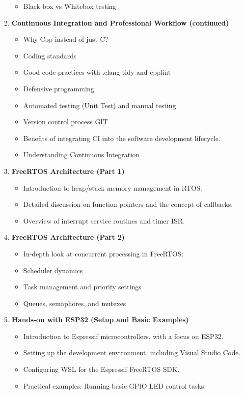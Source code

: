 \begin{enumerate}[label=\textbf{Week \arabic*:}]
\begin{itemize}
  \item Black box vs Whitebox testing
\end{itemize}
\item \textbf{ Continuous Integration and Professional Workflow (continued) }
\begin{itemize}
  \item Why Cpp instead of just C?
  \item Coding standards
  \item Good code practices with .clang-tidy and cpplint 
  \item Defensive programming
  \item Automated testing (Unit Test) and manual testing
  \item Version control process GIT
  \item Benefits of integrating CI into the software development lifecycle.
  \item Understanding Continuous Integration
\end{itemize}
\item \textbf{ FreeRTOS Architecture (Part 1) }
\begin{itemize}
  \item Introduction to heap/stack memory management in RTOS.
  \item Detailed discussion on function pointers and the concept of callbacks.
  \item Overview of interrupt service routines and timer ISR.
\end{itemize}
\item \textbf{ FreeRTOS Architecture (Part 2) }
\begin{itemize}
  \item In-depth look at concurrent processing in FreeRTOS:
  \item Scheduler dynamics
  \item Task management and priority settings
  \item Queues, semaphores, and mutexes
\end{itemize}
\item \textbf{ Hands-on with ESP32 (Setup and Basic Examples) }
\begin{itemize}
  \item Introduction to Espressif microcontrollers, with a focus on ESP32.
  \item Setting up the development environment, including Visual Studio Code.
  \item Configuring WSL for the Espressif FreeRTOS SDK.
  \item Practical examples: Running basic GPIO LED control tasks.

\end{itemize}
\end{enumerate}

